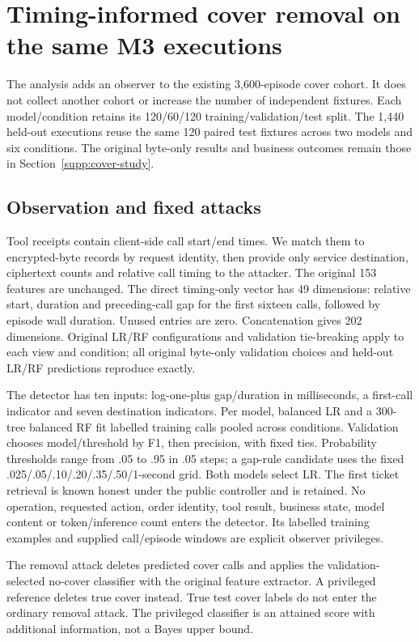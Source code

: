 \section{Timing-informed cover removal on the same M3 executions}\label{supp:b1-timing}
The analysis adds an observer to the existing 3,600-episode cover cohort. It does not collect another cohort or increase the number of independent fixtures. Each model/condition retains its 120/60/120 training/validation/test split. The 1,440 held-out executions reuse the same 120 paired test fixtures across two models and six conditions. The original byte-only results and business outcomes remain those in Section~\ref{supp:cover-study}.

\subsection{Observation and fixed attacks}
Tool receipts contain client-side call start/end times. We match them to encrypted-byte records by request identity, then provide only service destination, ciphertext counts and relative call timing to the attacker. The original 153 features are unchanged. The direct timing-only vector has 49 dimensions: relative start, duration and preceding-call gap for the first sixteen calls, followed by episode wall duration. Unused entries are zero. Concatenation gives 202 dimensions. Original LR/RF configurations and validation tie-breaking apply to each view and condition; all original byte-only validation choices and held-out LR/RF predictions reproduce exactly.

The detector has ten inputs: log-one-plus gap/duration in milliseconds, a first-call indicator and seven destination indicators. Per model, balanced LR and a 300-tree balanced RF fit labelled training calls pooled across conditions. Validation chooses model/threshold by F1, then precision, with fixed ties. Probability thresholds range from .05 to .95 in .05 steps; a gap-rule candidate uses the fixed .025/.05/.10/.20/.35/.50/1-second grid. Both models select LR. The first ticket retrieval is known honest under the public controller and is retained. No operation, requested action, order identity, tool result, business state, model content or token/inference count enters the detector. Its labelled training examples and supplied call/episode windows are explicit observer privileges.

The removal attack deletes predicted cover calls and applies the validation-selected no-cover classifier with the original feature extractor. A privileged reference deletes true cover instead. True test cover labels do not enter the ordinary removal attack. The privileged classifier is an attained score with additional information, not a Bayes upper bound.

